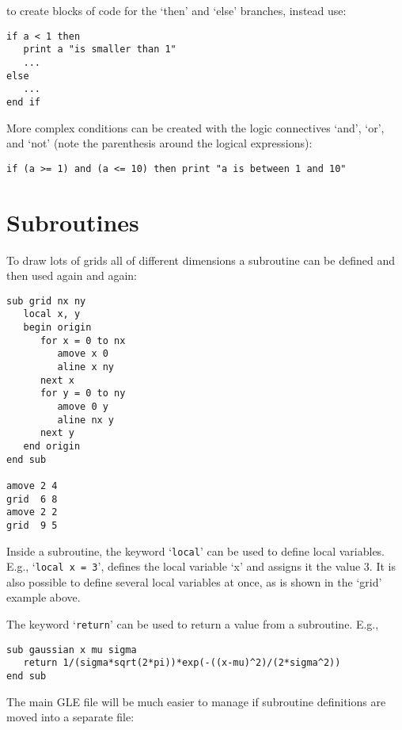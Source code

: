 \noindent{}to create blocks of code for the `then' and `else' branches, instead use:

\preglecode{}
\begin{Verbatim}
if a < 1 then
   print a "is smaller than 1"
   ...
else
   ...
end if
\end{Verbatim}
\postglecode{}

More complex conditions can be created with the logic connectives `{\sf and}', `{\sf or}', and `{\sf not}' (note the parenthesis around the logical expressions):

\preglecode{}
\begin{Verbatim}
if (a >= 1) and (a <= 10) then print "a is between 1 and 10"
\end{Verbatim}
\postglecode{}

\section{Subroutines}

To draw lots of grids all of different dimensions a subroutine can
be defined and then used again and again:

\preglecode{}
\begin{Verbatim}
sub grid nx ny 
   local x, y
   begin origin
      for x = 0 to nx
         amove x 0 
         aline x ny 
      next x
      for y = 0 to ny
         amove 0 y 
         aline nx y 
      next y 
   end origin
end sub
     
amove 2 4
grid  6 8
amove 2 2
grid  9 5
\end{Verbatim}
\postglecode{}

Inside a subroutine, the keyword `\texttt{local}' can be used to define local variables. E.g., `\texttt{local x = 3}', defines the local variable `x' and assigns it the value 3. It is also possible to define several local variables at once, as is shown in the `grid' example above.

The keyword `\texttt{return}' can be used to return a value from a subroutine. E.g.,

\preglecode{}
\begin{Verbatim}
sub gaussian x mu sigma
   return 1/(sigma*sqrt(2*pi))*exp(-((x-mu)^2)/(2*sigma^2))
end sub
\end{Verbatim}
\postglecode{}

The main GLE file will be much easier to manage if subroutine definitions are moved into a separate file:

